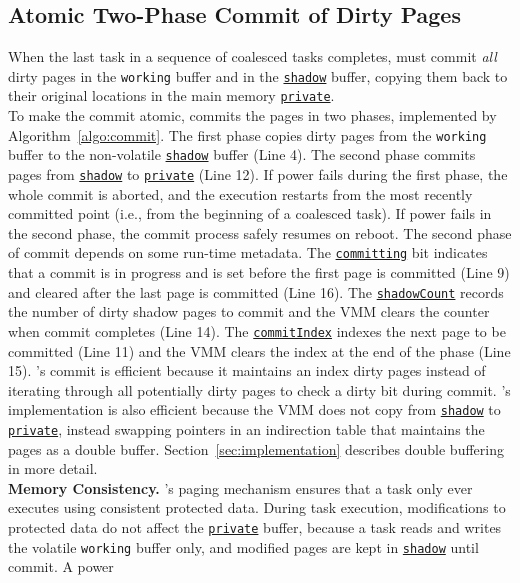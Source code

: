 \subsection{Atomic Two-Phase Commit of Dirty Pages}
%
When the last task in a sequence of coalesced tasks completes, \sys must commit
\emph{all} dirty pages in the \texttt{working} buffer and in the
\texttt{\underline{shadow}} buffer, copying them back to their original
locations in the main memory \texttt{\underline{private}}.\\
To make the commit atomic, \sys commits the pages in two phases, implemented by
Algorithm~\ref{algo:commit}.
%
The first phase copies dirty pages from the \texttt{working} buffer to the
non-volatile \texttt{\underline{shadow}} buffer (Line 4). The second phase
commits pages from \texttt{\underline{shadow}} to \texttt{\underline{private}}
(Line 12).  If power fails during the first phase, the whole commit is aborted,
and the execution restarts from the most recently committed point (i.e., from the beginning of a coalesced task). If power fails in the second
phase, the commit process safely resumes on reboot.  The second phase of commit
depends on some run-time metadata. The \texttt{\underline{committing}} bit
indicates that a commit is in progress and is set before the first page is
committed (Line 9) and cleared after the last page is committed (Line 16).  The
\texttt{\underline{shadowCount}} records the number of dirty shadow pages to
commit and the VMM clears the counter when commit completes (Line 14).  The
\texttt{\underline{commitIndex}} indexes the next page to be committed (Line
11) and the VMM clears the index at the end of the phase (Line 15).
%
\sys's commit is efficient because it maintains an index dirty pages instead of
iterating through all potentially dirty pages to check a dirty bit during
commit.
%
\sys's implementation is also efficient because the VMM does not
copy from \texttt{\underline{shadow}} to \texttt{\underline{private}}, instead
swapping pointers in an indirection table that maintains the pages as a double
buffer.  Section~\ref{sec:implementation} describes double buffering in more
detail. \\
%
\textbf{Memory Consistency.} \sys's paging mechanism ensures that a task only
ever executes using consistent protected data. During task execution,
modifications to protected data do not affect the \texttt{\underline{private}} buffer,
because a task reads and writes the volatile \texttt{working} buffer only, and
modified pages are kept in \texttt{\underline{shadow}} until commit.  A power
